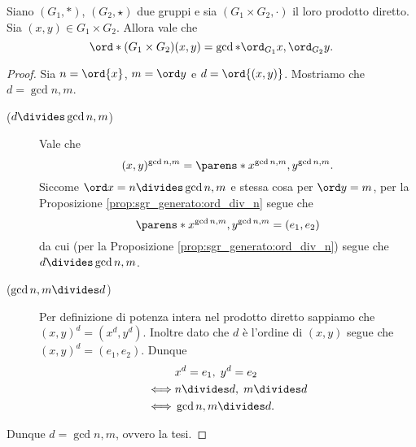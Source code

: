 \begin{proposition}
    \label{prop:ord_prod_diretto}
    Siano $(G_1, *)$, $(G_2, \star)$ due gruppi e sia $(G_1 \times G_2, \cdot)$ il loro prodotto diretto. Sia $(x, y) \in G_1 \times G_2$. Allora vale che \[
        \ord*(G_1 \times G_2){(x, y)} = \gcd*{\ord_{G_1}{x}, \ord_{G_2}{y}}.    
    \]
\end{proposition}
\begin{proof}
    Sia $n = \ord{x}$, $m = \ord y$ e $d = \ord{(x, y)}$. Mostriamo che $d = \gcd{n, m}$.
    \begin{description}
        \item[($d \divides \gcd{n, m}$)] Vale che \[
            (x, y)^{\gcd{n, m}} = \parens*{x^{\gcd{n, m}}, y^{\gcd{n, m}}}.   
        \] Siccome $\ord x = n \divides \gcd{n, m}$ e stessa cosa per $\ord y = m$, per la Proposizione \ref{prop:sgr_generato:ord_div_n} segue che \begin{equation*}
            \parens*{x^{\gcd{n, m}}, y^{\gcd{n, m}}} = (e_1, e_2)
        \end{equation*}
        da cui (per la Proposizione \ref{prop:sgr_generato:ord_div_n}) segue che $d \divides \gcd{n, m}$.
        \item[($\gcd{n, m} \divides d$)] Per definizione di potenza intera nel prodotto diretto sappiamo che $(x, y)^d = (x^d, y^d)$. Inoltre dato che $d$ è l'ordine di $(x, y)$ segue che $(x, y)^d = (e_1, e_2)$. Dunque \begin{align*}
            &x^d = e_1, \; y^d = e_2\\
            \iff &n \divides d, \; m \divides d \\
            \iff &\gcd{n, m} \divides d.
        \end{align*}
    \end{description}
    Dunque $d = \gcd{n, m}$, ovvero la tesi.
\end{proof}

